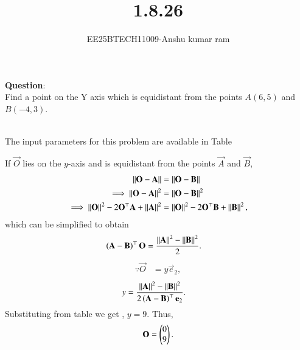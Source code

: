 \documentclass[journal]{IEEEtran}
\begin{document}

\vspace{3cm}

\title{1.8.26}
\author{EE25BTECH11009-Anshu kumar ram}
\maketitle
{\let\newpage\relax\maketitle}

\renewcommand{\thefigure}{\theenumi}
\renewcommand{\thetable}{\theenumi}
\setlength{\intextsep}{10pt}

\renewcommand{\thetable}{\theenumi}

\textbf{Question}:\\
Find a point on the Y axis which is equidistant from the points $A(6, 5)$ and $B(-4, 3)$.

\solution \\
The input parameters for this problem are available in Table 



If $\vec{O}$ lies on the $y$-axis and is equidistant from the points $\vec{A}$ and $\vec{B}$, 
\begin{align}
 \left\lVert\mathbf{O}-\mathbf{A}\right\rVert &=
\left\lVert\mathbf{O}-\mathbf{B}\right\rVert 
\\
 \implies \left\lVert\mathbf{O}-\mathbf{A}\right\rVert^2 &=
\left\lVert\mathbf{O}-\mathbf{B}\right\rVert^2 
\\
 \implies \left\lVert\mathbf{O}\right\rVert^2-2{\mathbf{O}}^{\top}\mathbf{A} + \left\lVert\mathbf{A}\right\rVert^2
	&= \left\lVert\mathbf{O}\right\rVert^2-2{\mathbf{O}}^{\top}\mathbf{B} + \left\lVert\mathbf{B}\right\rVert^2,
\end{align}
which can be simplified to obtain
\begin{align}
	  \left(\mathbf{A}-\mathbf{B}\right)^\top   \mathbf{O}&=\frac{\left\lVert\mathbf{A}\right\rVert^2 -\left\lVert\mathbf{B}\right\rVert^2 }{2}.
\end{align}
\begin{align}
\because \vec{O} &= y\vec{e}_2,
\end{align}
\begin{align}
 y &=\frac{\left\lVert\mathbf{A}\right\rVert^2 -\left\lVert\mathbf{B}\right\rVert^2 }{2\left(\mathbf{A}-\mathbf{B}\right)^{\top }\mathbf{e}_2}.
 \label{eq:10/7/1/75}  
\end{align}
Substituting from table we get ,
 $y =  9$.  Thus, 
\begin{align}
\mathbf{O} = \begin{pmatrix} 0 \\ 9\end{pmatrix}.
\end{align}
\end{document}
